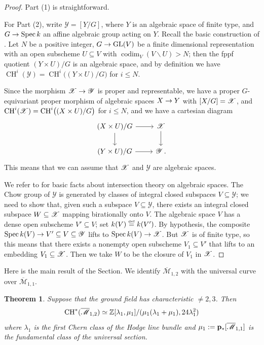 \documentclass[a4paper, 10pt]{amsart}
\numberwithin{equation}{section}
\numberwithin{subsection}{section}
\newtheorem{theorem}{Theorem}[section]
\theoremstyle{definition}
\theoremstyle{remark}
\renewcommand{\mathcal}{\mathscr}
\newcommand\cM{\mathcal{M}} \newcommand\cN{\mathcal{N}}
\newcommand\cY{\mathcal{Y}} \newcommand\cZ{\mathcal{Z}}
\newcommand\arr{\ifinner\to\else\longrightarrow\fi}
\newcommand{\eqdef}{\mathrel{\smash{\overset{\mathrm{\scriptscriptstyle def}} =}}}
\newcommand\spec{\operatorname{Spec}}
\newcommand\codim{\operatorname{codim}}
\renewcommand{\setminus}{\smallsetminus}
\newcommand{\GL}{\mathrm{GL}}
\newcommand{\Mbar}{\overline{\cM}}
\newcommand{\ch}[1][*]{\operatorname{CH}^{#1}}
\newcommand{\modangelo}{\marginpar{}}
\begin{document}
	\begin{proof}
	
		Part (1) is straightforward.
		
\modangelo For Part (2), write $\cY = [Y/G]$, where $Y$ is an algebraic space of finite type, and $G \arr \spec k$ an affine algebraic group acting on $Y$. Recall the basic construction of \cite{EG}. Let $N$ be a positive integer, $G \arr \GL(V)$ be a finite dimensional representation with an open subscheme $U \subseteq V$ with $\codim_{V}(V \setminus U) > N$; then the fppf quotient $(Y\times U)/G$ is an algebraic space, and by definition we have $\ch[i](\cY) = \ch[i]\bigl((Y\times U)/G\bigr)$ for $i \leq N$. 

Since the morphism $\cX \arr \cY$ is proper and representable, we have a proper $G$-equivariant proper morphism of algebraic spaces $X \arr Y$ with $[X/G] = \cX$, and $\ch[i](\cX) = \ch[i]\bigl((X\times U)/G\bigr)$ for $i \leq N$, and we have a cartesian diagram
   \[
   \begin{tikzcd}
   (X\times U)/G \rar\dar & \cX \dar\\
   (Y\times U)/G \rar & \cY\,.
   \end{tikzcd}
   \]
This means that we can assume that $\cX$ and $\cY$ are algebraic spaces.

We refer to \cite[\S6.1]{EG} for basic facts about intersection theory on algebraic spaces. The Chow group of $\cY$ is generated by classes of integral closed subspaces $V \subseteq \cY$; we need to show that, given such a subspace $V \subseteq \cY$, there exists an integral closed subspace $W \subseteq \cX$ mapping birationally onto $V$. The algebraic space $V$ has a dense open subscheme $V' \subseteq V$; set $k(V) \eqdef k(V')$. By hypothesis, the composite  $\spec k(V) \arr V' \subseteq V \subseteq \cY$ lifts to $\spec k(V) \arr \cX$. But $\cX$ is of finite type, so this means that there exists a nonempty open subscheme $V_{1} \subseteq V'$ that lifts to an embedding $V_{1} \subseteq \cX$. Then we take $W$ to be the closure of $V_{1}$ in $\cX$.
	\end{proof}
	
	Here is the main result of the Section. We identify $\Mbar_{1,2}$ with the universal curve over $\Mbar_{1,1}$.
	\begin{theorem}\label{thm:chow Mbar12}
		Suppose that the ground field has characteristic $\neq 2,3$. Then
		\[ \ch(\Mbar_{1,2}) \simeq \ZZ[\lambda_1,\mu_1]/(\mu_1(\lambda_1+\mu_1),24\lambda_1^2) \]
		where $\lambda_1$ is the first Chern class of the Hodge line bundle and $\mu_1:=\bfp_*[\Mbar_{1,1}]$ is the fundamental class of the universal section.
	\end{theorem}
	
\end{document}
